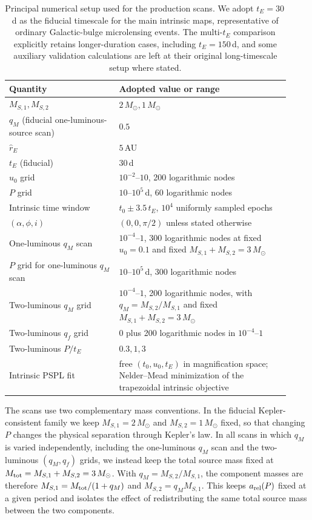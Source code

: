 \documentclass{article}
\begin{document}
\begin{table}[t]
\centering
\caption{Principal numerical setup used for the production scans. We adopt
$t_E=30\,$d as the fiducial timescale for the main intrinsic maps, representative
of ordinary Galactic-bulge microlensing events. The multi-$t_E$ comparison
explicitly retains longer-duration cases, including $t_E=150\,$d, and some
auxiliary validation calculations are left at their original long-timescale
setup where stated.}
\label{tab:numerical_setup}
\begin{tabular}{p{0.36\linewidth}p{0.56\linewidth}}
\toprule
Quantity & Adopted value or range \\
\midrule
$M_{S,1},M_{S,2}$ & $2\,M_\odot,1\,M_\odot$ \\
$q_M$ (fiducial one-luminous-source scan) & $0.5$ \\
$\hat r_E$ & $5\,$AU \\
$t_E$ (fiducial) & $30\,$d \\
$u_0$ grid & $10^{-2}$--$10$, 200 logarithmic nodes \\
$P$ grid & $10$--$10^5\,$d, 60 logarithmic nodes \\
Intrinsic time window & $t_0\pm3.5\,t_E$, $10^4$ uniformly sampled epochs \\
$(\alpha,\phi,i)$ & $(0,0,\pi/2)$ unless stated otherwise \\
One-luminous $q_M$ scan & $10^{-4}$--$1$, 300 logarithmic nodes at fixed $u_0=0.1$ and fixed $M_{S,1}+M_{S,2}=3\,M_\odot$ \\
$P$ grid for one-luminous $q_M$ scan & $10$--$10^5\,$d, 300 logarithmic nodes \\
Two-luminous $q_M$ grid & $10^{-4}$--$1$, 200 logarithmic nodes, with $q_M=M_{S,2}/M_{S,1}$ and fixed $M_{S,1}+M_{S,2}=3\,M_\odot$ \\
Two-luminous $q_f$ grid & $0$ plus 200 logarithmic nodes in $10^{-4}$--$1$ \\
Two-luminous $P/t_E$ & $0.3,1,3$ \\
Intrinsic PSPL fit & free $(t_0,u_0,t_E)$ in magnification space; Nelder--Mead minimization of the trapezoidal intrinsic objective \\
\bottomrule
\end{tabular}
\end{table}

The scans use two complementary mass conventions. In the fiducial
Kepler-consistent family we keep $M_{S,1}=2\,M_\odot$ and
$M_{S,2}=1\,M_\odot$ fixed, so that changing $P$ changes the physical
separation through Kepler's law. In all scans in which $q_M$ is varied
independently, including the one-luminous $q_M$ scan and the
two-luminous $(q_M,q_f)$ grids, we instead keep the total source mass
fixed at $M_{\rm tot}=M_{S,1}+M_{S,2}=3\,M_\odot$. With
$q_M=M_{S,2}/M_{S,1}$, the component masses are therefore
$M_{S,1}=M_{\rm tot}/(1+q_M)$ and
$M_{S,2}=q_M M_{S,1}$. This keeps $a_{\rm rel}(P)$ fixed at a given
period and isolates the effect of redistributing the same total source
mass between the two components.
\end{document}
